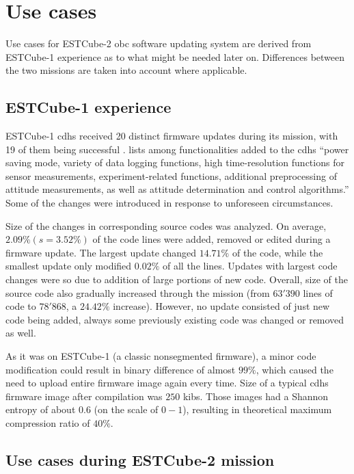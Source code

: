 \newpage
\section{Use cases}

Use cases for ESTCube-2 \gls{obc} software updating system are derived from ESTCube-1 experience as to what might be needed later on. Differences between the two missions are taken into account where applicable.

\subsection{ESTCube-1 experience}

ESTCube-1 \gls{cdhs} received 20 distinct firmware updates during its mission, with 19 of them being successful \cite{Suenter2016}. \textcite{Slavinskis2015} lists among functionalities added to the \gls{cdhs} ``power saving mode, variety of data logging functions, high time-resolution functions for sensor measurements, experiment-related functions, additional preprocessing of attitude measurements, as well as attitude determination and control algorithms.'' Some of the changes were introduced in response to unforeseen circumstances.

Size of the changes in corresponding source codes was analyzed. On average, $2.09\% (s=3.52\%)$ of the code lines were added, removed or edited during a firmware update. The largest update changed $14.71\%$ of the code, while the smallest update only modified $0.02\%$ of all the lines. Updates with largest code changes were so due to addition of large portions of new code. Overall, size of the source code also gradually increased through the mission (from $63'390$ lines of code to $78'868$, a $24.42\%$ increase). However, no update consisted of just new code being added, always some previously existing code was changed or removed as well.

As it was on ESTCube-1 (a classic nonsegmented firmware), a minor code modification could result in binary difference of almost $99\%$, which caused the need to upload entire firmware image again every time. Size of a typical \gls{cdhs} firmware image after compilation was $250$ \glspl{kib}. Those images had a Shannon entropy of about $0.6$ (on the scale of $0-1$), resulting in theoretical maximum compression ratio of $40\%$. \cite{Suenter2016}

\subsection{Use cases during ESTCube-2 mission}

